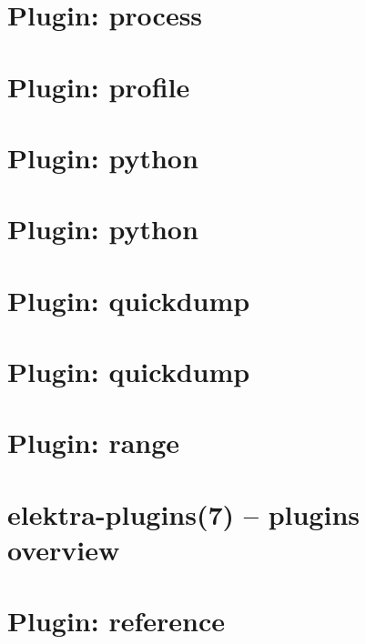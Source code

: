 \let\mypdfximage\pdfximage\def\pdfximage{\immediate\mypdfximage}\documentclass[twoside]{book}
\newcommand{\+}{\discretionary{\mbox{\scriptsize$\hookleftarrow$}}{}{}}
\begin{document}
\chapter{Plugin\+: process}
\label{md_src_plugins_process_README}

\chapter{Plugin\+: profile}
\label{md_src_plugins_profile_README}

\chapter{Plugin\+: python}
\label{md_src_plugins_python_python_dns_README}

\chapter{Plugin\+: python}
\label{md_src_plugins_python_README}

\chapter{Plugin\+: quickdump}
\label{md_src_plugins_quickdump_benchmarks}

\chapter{Plugin\+: quickdump}
\label{md_src_plugins_quickdump_README}

\chapter{Plugin\+: range}
\label{md_src_plugins_range_README}

\chapter{elektra-\/plugins(7) -- plugins overview}
\label{src_plugins_README_md}

\chapter{Plugin\+: reference}
\label{md_src_plugins_reference_examples_alternative_README}

\end{document}

